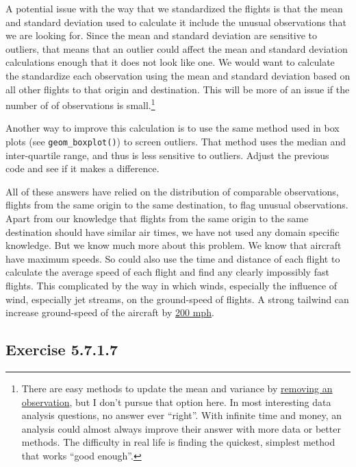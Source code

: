 \documentclass[]{book}
\let\rmarkdownfootnote\footnote%
\def\footnote{\protect\rmarkdownfootnote}
\theoremstyle{plain}
\theoremstyle{remark}
\begin{document}
A potential issue with the way that we standardized the flights is that
the mean and standard deviation used to calculate it include the unusual
observations that we are looking for. Since the mean and standard
deviation are sensitive to outliers, that means that an outlier could
affect the mean and standard deviation calculations enough that it does
not look like one. We would want to calculate the standardize each
observation using the mean and standard deviation based on all other
flights to that origin and destination. This will be more of an issue if
the number of of observations is small.\footnote{There are easy methods
  to update the mean and variance by
  \href{https://en.wikipedia.org/wiki/Algorithms_for_calculating_variance}{removing
  an observation}, but I don't pursue that option here. In most
  interesting data analysis questions, no answer ever ``right''. With
  infinite time and money, an analysis could almost always improve their
  answer with more data or better methods. The difficulty in real life
  is finding the quickest, simplest method that works ``good enough''.}

Another way to improve this calculation is to use the same method used
in box plots (see \texttt{geom\_boxplot()}) to screen outliers. That
method uses the median and inter-quartile range, and thus is less
sensitive to outliers. Adjust the previous code and see if it makes a
difference.

All of these answers have relied on the distribution of comparable
observations, flights from the same origin to the same destination, to
flag unusual observations. Apart from our knowledge that flights from
the same origin to the same destination should have similar air times,
we have not used any domain specific knowledge. But we know much more
about this problem. We know that aircraft have maximum speeds. So could
also use the time and distance of each flight to calculate the average
speed of each flight and find any clearly impossibly fast flights. This
complicated by the way in which winds, especially the influence of wind,
especially jet streams, on the ground-speed of flights. A strong
tailwind can increase ground-speed of the aircraft by
\href{https://www.wired.com/story/norwegian-air-transatlantic-speed-record/}{200
mph}.

\hypertarget{exercise-5.7.1.7}{%
\subsection*{\texorpdfstring{Exercise
{5.7.1.7}}{Exercise 5.7.1.7}}\label{exercise-5.7.1.7}}
\end{document}
